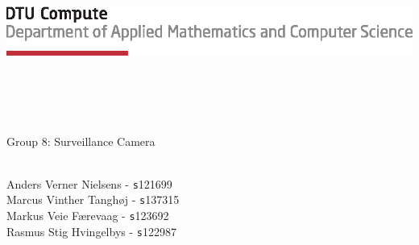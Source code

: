 
\begin{titlepage}
\null
\includegraphics[scale=1]{figures/tex_dtu_compute_a_uk}\\[10pt]
\addtolength{\wpXoffset}{-6cm}
\addtolength{\wpYoffset}{-10cm}


{\huge\bfseries \COURSE}\\\ \\
{\LARGE\bfseries \TITLE }\\\ \\
Group 8: Surveillance Camera\\
\ \\
{\DATE}

\vspace{140pt}

Anders Verner Nielsens - {\texttt s121699}\\
Marcus Vinther Tanghøj - {\texttt s137315}\\
Markus Veie Færevaag - {\texttt s123692}\\
Rasmus Stig Hvingelbys - {\texttt s122987} \\
\\
[3cm]
\end{titlepage}

\newpage
